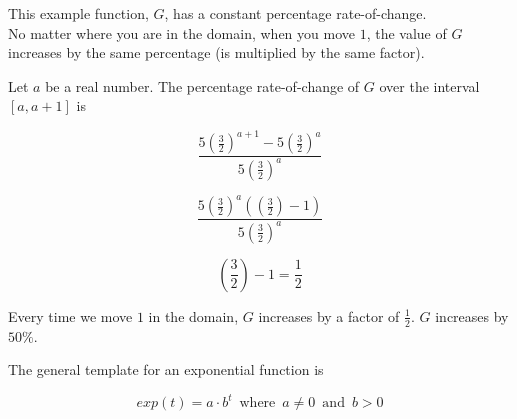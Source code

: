 \documentclass{ximera}
\begin{document}
This example function, $G$, has a constant percentage rate-of-change. \\

No matter where you are in the domain, when you move $1$, the value of $G$ increases by the same percentage (is multiplied by the same factor).


Let $a$ be a real number.  The percentage rate-of-change of $G$ over the interval $[a,a+1]$ is 



\[    \frac{5 \left(\frac{3}{2}\right)^{a+1} - 5 \left(\frac{3}{2}\right)^a}{5 \left(\frac{3}{2}\right)^a}       \]


\[   \frac{5 \left(\frac{3}{2}\right)^a (\left(\frac{3}{2}\right) - 1) }{5 \left(\frac{3}{2}\right)^a}    \]


\[   \left(\frac{3}{2}\right) - 1 = \frac{1}{2}   \]

Every time we move $1$ in the domain, $G$ increases by a factor of $\frac{1}{2}$.  $G$ increases by $50\%$.





The general template for an exponential function is 

\[   exp(t) = a \cdot b^t   \, \text{ where } \,  a \ne 0  \, \text{ and } \,    b > 0   \]
\end{document}
